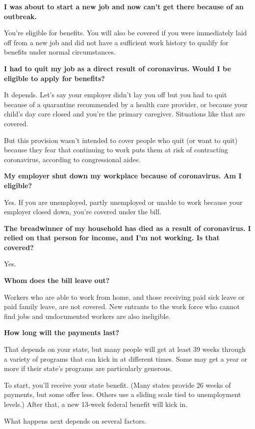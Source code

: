 \textbf{I was about to start a new job and now can't get there because
of an outbreak.}

You're eligible for benefits. You will also be covered if you were
immediately laid off from a new job and did not have a sufficient work
history to qualify for benefits under normal circumstances.

\textbf{I had to quit my job as a direct result of coronavirus. Would I
be eligible to apply for benefits?}

It depends. Let's say your employer didn't lay you off but you had to
quit because of a quarantine recommended by a health care provider, or
because your child's day care closed and you're the primary caregiver.
Situations like that are covered.

But this provision wasn't intended to cover people who quit (or want to
quit) because they fear that continuing to work puts them at risk of
contracting coronavirus, according to congressional aides.

\textbf{My employer shut down my workplace because of coronavirus. Am I
eligible?}

Yes. If you are unemployed, partly unemployed or unable to work because
your employer closed down, you're covered under the bill.

\textbf{The breadwinner of my household has died as a result of
coronavirus. I relied on that person for income, and I'm not working. Is
that covered?}

Yes.

\textbf{Whom does the bill leave out?}

Workers who are able to work from home, and those receiving paid sick
leave or paid family leave, are not covered. New entrants to the work
force who cannot find jobs and undocumented workers are also ineligible.

\textbf{How long will the payments last?}

That depends on your state, but many people will get at least 39 weeks
through a variety of programs that can kick in at different times. Some
may get a year or more if their state's programs are particularly
generous.

To start, you'll receive your state benefit. (Many states provide 26
weeks of payments, but some offer less. Others use a sliding scale tied
to unemployment levels.) After that, a new 13-week federal benefit will
kick in.

What happens next depends on several factors.

